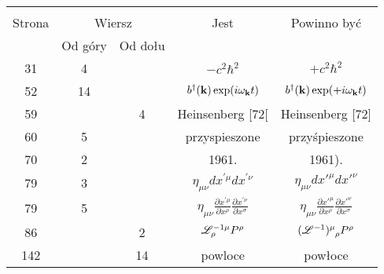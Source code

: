 \documentclass[a4paper,11pt]{article}
\begin{document}
\begin{center}

  \begin{tabular}{|c|c|c|c|c|}
    \hline
    & \multicolumn{2}{c|}{} & & \\
    Strona & \multicolumn{2}{c|}{Wiersz} & Jest
                              & Powinno być \\ \cline{2-3}
    & Od góry & Od dołu & & \\
    \hline
    31 & 4 & & $-c^{ 2 } \hbar^{ 2 }$ & $+c^{ 2 } \hbar^{ 2 }$ \\
    52 & 14 & & $b^{ \dagger }( \mathbf{k} ) \exp( i \omega_{ \mathbf{k} } t )$
           & $b^{ \dagger }( \mathbf{k} ) \exp( +i \omega_{ \mathbf{k} } t )$ \\
    59 & & 4 & Heinsenberg [72[ & Heinsenberg [72] \\ %
    60 & 5 & & przyspieszone & przyśpieszone \\
    70 & 2 & & 1961. & 1961). \\
    79 & 3 & & $\eta_{ \mu \nu } dx^{ ' \mu } dx^{ ' \nu }$
           & $\eta_{ \mu \nu } dx'^{ \mu } dx'^{ \nu }$ \\
    79 & 5 & & $\eta_{ \mu \nu } \frac{ \partial x^{ ' \mu } }{ \partial x^{ \rho } }
               \frac{ \partial x^{ ' \nu } }{ \partial x^{ \sigma } }$
           & $\eta_{ \mu \nu } \frac{ \partial x'^{ \mu } }{ \partial x^{ \rho } }
             \frac{ \partial x'^{ \nu } }{ \partial x^{ \sigma } }$ \\
    86 & & 2 & $\mathcal{L}_{ \rho }^{ -1 \mu } P^{ \rho }$
           & $\tensor[]{ ( \Lcal^{ -1 } ) }{ ^{ \mu }_{ \rho } } P^{ \rho }$ \\
    142 & & 14 & powloce & powłoce \\
    \hline
  \end{tabular}






\end{center}
\end{document}
